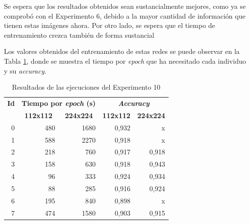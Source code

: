 Se espera que los resultados obtenidos sean sustancialmente mejores, como ya se comprobó con el Experimento 6, debido a la mayor cantidad de información que tienen estas imágenes ahora. Por otro lado, se espera que el tiempo de entrenamiento crezca también de forma sustancial

Los valores obtenidos del entrenamiento de estas redes se puede observar en la Tabla \ref{tab:exp10_resultado}, donde se muestra el tiempo por \textit{epoch} que ha necesitado cada individuo y su \textit{accuracy}.

\begin{table}[h]
\caption{Resultados de las ejecuciones del Experimento 10}
\label{tab:exp10_resultado}
\centering
\begin{tabular}{r|r|r|rr}
\toprule
\multicolumn{1}{c|}{\textbf{Id}} & \multicolumn{2}{c|}{\textbf{Tiempo por \textit{epoch} (s)}}                            & \multicolumn{2}{c}{\textbf{\textit{Accuracy}}}                                        \\
\multicolumn{1}{c|}{\textbf{}}   & \multicolumn{1}{c|}{\textbf{112x112}} & \multicolumn{1}{c|}{\textbf{224x224}} & \multicolumn{1}{c|}{\textbf{112x112}} & \multicolumn{1}{c}{\textbf{224x224}} \\ \hline
0                                & 480                                   & 1680                                  & \multicolumn{1}{r|}{0,932}            & x                                    \\
1                                & 588                                   & 2270                                  & \multicolumn{1}{r|}{0,918}            & x                                    \\
2                                & 218                                   & 760                                   & \multicolumn{1}{r|}{0,917}            & 0,918
                                    \\
3                                & 158                                   & 630                                   & \multicolumn{1}{r|}{0,918}            & 0,943                                    \\
4                                & 96                                    & 333                                   & \multicolumn{1}{r|}{0,924}            & 0,934                                    \\
5                                & 88                                    & 285                                   & \multicolumn{1}{r|}{0,916}            & 0,924
                                    \\
6                                & 195                                   & 840                                   & \multicolumn{1}{r|}{0,898}            & x                                    \\
7                                & 474                                   & 1580                                  & \multicolumn{1}{r|}{0,903}            & 0,915      \\
\bottomrule
\end{tabular}
\end{table}

